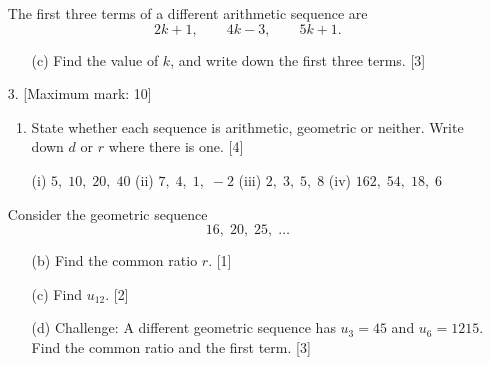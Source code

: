 \documentclass[12pt, twoside]{article}
\begin{document}
\begin{enumerate}[itemsep=0.15cm]
The first three terms of a different arithmetic sequence are
$$2k + 1, \qquad 4k - 3, \qquad 5k + 1.$$

\begin{enumerate}[itemsep=0.1cm]
  \item[(c)] Find the value of $k$, and write down the first three terms.
  \hfill [3]
\end{enumerate}


\newpage

\item[3.] [Maximum mark: 10]

\begin{enumerate}[itemsep=0.1cm]
  \item State whether each sequence is arithmetic, geometric or neither.
  Write down $d$ or $r$ where there is one. \hfill [4]

  \hspace*{1em} (i) $5,\; 10,\; 20,\; 40$ \hfill (ii) $7,\; 4,\; 1,\; -2$
  \hfill (iii) $2,\; 3,\; 5,\; 8$ \hfill (iv) $162,\; 54,\; 18,\; 6$
  \hspace*{1em}
\end{enumerate}

Consider the geometric sequence
$$16,\; 20,\; 25,\; \ldots$$

\begin{enumerate}[itemsep=0.1cm]
  \item[(b)] Find the common ratio $r$. \hfill [1]
  \item[(c)] Find $u_{12}$. \hfill [2]
  \item[(d)] Challenge: A different geometric sequence has $u_{3} = 45$
  and $u_{6} = 1215$. Find the common ratio and the first term. \hfill [3]
\end{enumerate}


\newpage


\end{enumerate}
\end{document}
